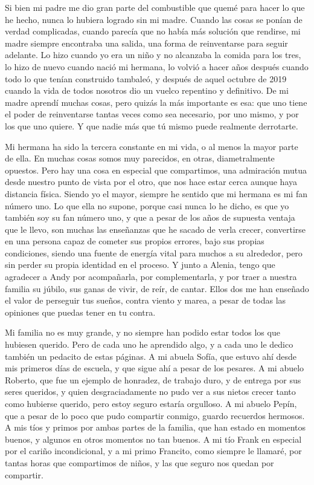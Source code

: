 Si bien mi padre me dio gran parte del combustible que quemé para hacer lo que he hecho, nunca lo hubiera logrado sin mi madre.
Cuando las cosas se ponían de verdad complicadas, cuando parecía que no había más solución que rendirse, mi madre siempre encontraba una salida, una forma de reinventarse para seguir adelante.
Lo hizo cuando yo era un niño y no alcanzaba la comida para los tres, lo hizo de nuevo cuando nació mi hermana, lo volvió a hacer años después cuando todo lo que tenían construido tambaleó, y después de aquel octubre de 2019 cuando la vida de todos nosotros dio un vuelco repentino y definitivo.
De mi madre aprendí muchas cosas, pero quizás la más importante es esa: que uno tiene el poder de reinventarse tantas veces como sea necesario, por uno mismo, y por los que uno quiere.
Y que nadie más que tú mismo puede realmente derrotarte.

Mi hermana ha sido la tercera constante en mi vida, o al menos la mayor parte de ella.
En muchas cosas somos muy parecidos, en otras, diametralmente opuestos.
Pero hay una cosa en especial que compartimos, una admiración mutua desde nuestro punto de vista por el otro, que nos hace estar cerca aunque haya distancia física.
Siendo yo el mayor, siempre he sentido que mi hermana es mi fan número uno.
Lo que ella no supone, porque casi nunca lo he dicho, es que yo también soy su fan número uno, y que a pesar de los años de supuesta ventaja que le llevo, son muchas las enseñanzas que he sacado de verla crecer, convertirse en una persona capaz de cometer sus propios errores, bajo sus propias condiciones, siendo una fuente de energía vital para muchos a su alrededor, pero sin perder su propia identidad en el proceso.
Y junto a Alenia, tengo que agradecer a Andy por acompañarla, por complementarla, y por traer a nuestra familia su júbilo, sus ganas de vivir, de reír, de cantar.
Ellos dos me han enseñado el valor de perseguir tus sueños, contra viento y marea, a pesar de todas las opiniones que puedas tener en tu contra.

Mi familia no es muy grande, y no siempre han podido estar todos los que hubiesen querido. Pero de cada uno he aprendido algo, y a cada uno le dedico también un pedacito de estas páginas.
A mi abuela Sofía, que estuvo ahí desde mis primeros días de escuela, y que sigue ahí a pesar de los pesares.
A mi abuelo Roberto, que fue un ejemplo de honradez, de trabajo duro, y de entrega por sus seres queridos, y quien desgraciadamente no pudo ver a sus nietos crecer tanto como hubierse querido, pero estoy seguro estaría orgulloso.
A mi abuelo Pepín, que a pesar de lo poco que pudo compartir conmigo, guardo recuerdos hermosos. A mis tíos y primos por ambas partes de la familia, que han estado en momentos buenos, y algunos en otros momentos no tan buenos.
A mi tío Frank en especial por el cariño incondicional, y a mi primo Francito, como siempre le llamaré, por tantas horas que compartimos de niños, y las que seguro nos quedan por compartir.

